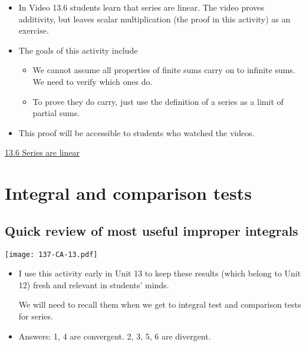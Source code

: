 \documentclass[11pt]{article}
\newcommand{\nl}{\hfill \vspace{-1.1\baselineskip}} %
\newcommand{\vvi}{\hspace{8mm} \href{https://www.youtube.com/watch?v=x8zxHukU-UE&list=PLlwePzQY_wW-FJMnD_ybkXU_jZLVtZttI&index=6}{13.6 Series are linear} }
\begin{document}
\begin{comments}
\nl
	\begin{itemize}
		\item   In Video 13.6 students learn that series are linear.  The video proves additivity, but leaves scalar multiplication (the proof in this activity) as an exercise.
		\item  The goals of this activity include
			\begin{itemize}
				\item We cannot assume all properties of finite sums carry on to infinite sums.  We need to verify which ones do.
				\item  To prove they do carry, just use the definition of a series as a limit of partial sums.
			\end{itemize}
		\item This proof will be accessible to students who watched the videos.
	\end{itemize}
\end{comments}

\begin{videos}
\vvi
\end{videos}

\newpage
\section{Integral and comparison tests}
\subsection{Quick review of most useful improper integrals}

\begin{center}
{ \texttt{[image: 137-CA-13.pdf]}} 
\end{center}

\begin{comments}
\nl
	\begin{itemize}
		\item   I use this activity early in Unit 13 to keep these results (which belong to Unit 12) fresh and relevant in students' minds.   
		
		We will need to recall them when we get to integral test and comparison tests for series.
		
		\item Answers:  1, 4 are convergent.  2, 3, 5, 6 are divergent.
	\end{itemize}
\end{comments}
\end{document}
